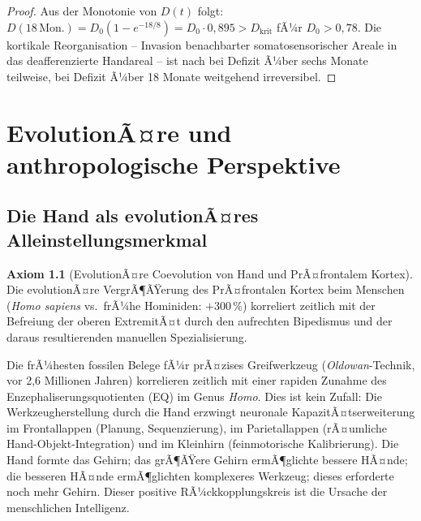 ﻿\documentclass[12pt,a4paper]{report}
\theoremstyle{plain}
\theoremstyle{definition}
\newtheorem{axiom}[theorem]{Axiom}
\theoremstyle{remark}
\begin{document}
\begin{proof}
Aus der Monotonie von $D(t)$ folgt: $D(18\,\text{Mon.}) = D_0(1 - e^{-18/8})
= D_0 \cdot 0{,}895 > D_{\text{krit}}$ fÃ¼r $D_0 > 0{,}78$. Die kortikale
Reorganisation -- Invasion benachbarter somatosensorischer Areale in das
deafferenzierte Handareal -- ist nach \cite{merzenich1984} bei Defizit Ã¼ber
sechs Monate teilweise, bei Defizit Ã¼ber 18 Monate weitgehend irreversibel.
\end{proof}

\chapter{EvolutionÃ¤re und anthropologische Perspektive}
\label{chap:evolution}

\section{Die Hand als evolutionÃ¤res Alleinstellungsmerkmal}

\begin{axiom}[EvolutionÃ¤re Coevolution von Hand und PrÃ¤frontalem Kortex]
\label{ax:coevolution}
Die evolutionÃ¤re VergrÃ¶ÃŸerung des PrÃ¤frontalen Kortex beim Menschen
(\emph{Homo sapiens} vs.\ frÃ¼he Hominiden: $+$300\,\%) korreliert zeitlich
mit der Befreiung der oberen ExtremitÃ¤t durch den aufrechten Bipedismus
und der daraus resultierenden manuellen Spezialisierung.
\end{axiom}

Die frÃ¼hesten fossilen Belege fÃ¼r prÃ¤zises Greifwerkzeug (\emph{Oldowan}-Technik,
vor 2{,}6 Millionen Jahren) korrelieren zeitlich mit einer rapiden Zunahme
des Enzephaliserungsquotienten (EQ) im Genus \emph{Homo}. Dies ist kein
Zufall: Die Werkzeugherstellung durch die Hand erzwingt neuronale
KapazitÃ¤tserweiterung im Frontallappen (Planung, Sequenzierung), im
Parietallappen (rÃ¤umliche Hand-Objekt-Integration) und im Kleinhirn
(feinmotorische Kalibrierung). Die Hand formte das Gehirn; das grÃ¶ÃŸere
Gehirn ermÃ¶glichte bessere HÃ¤nde; die besseren HÃ¤nde ermÃ¶glichten
komplexeres Werkzeug; dieses erforderte noch mehr Gehirn. Dieser
positive RÃ¼ckkopplungskreis ist die Ursache der menschlichen Intelligenz.
\end{document}
